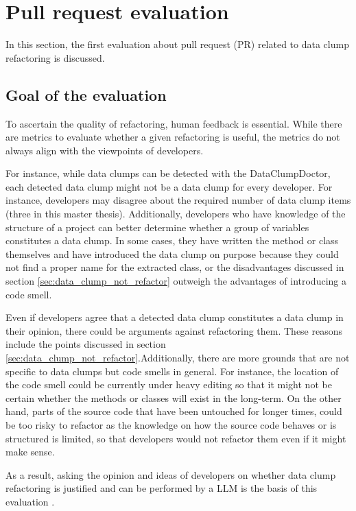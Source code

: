 \section{Pull request evaluation}
In this section, the first evaluation about pull request (PR) related to data clump refactoring is discussed. 

\subsection{Goal of the evaluation}

To ascertain the quality of refactoring, human feedback is essential. While there are metrics to evaluate whether a given refactoring is useful, the metrics do not always align with the viewpoints of developers. 

 For instance, while data clumps can be detected with the DataClumpDoctor, each detected data clump might not be a data clump for every developer. For instance, developers may disagree about the required number of data clump items (three in this master thesis). Additionally, developers who have knowledge of the structure of a project can better determine whether a group of variables  constitutes a data clump. In some cases, they have written the method or class themselves and have introduced the data clump on purpose because they could not find a proper name for the extracted class, or the disadvantages discussed in section \ref{sec:data_clump_not_refactor} outweigh the advantages of introducing a code smell. 

Even if developers agree that a detected data clump constitutes a data clump  in their opinion, there could be arguments against refactoring them. These reasons include the points  discussed in section \ref{sec:data_clump_not_refactor}.Additionally, there are more grounds that are not specific to data clumps but code smells in general. For instance, the location of the code smell could be currently under heavy editing so that it might not be certain whether the methods or classes will exist in the long-term. On the other hand, parts of the source code that have been untouched for longer times, could be too risky to refactor as the knowledge on how the source code behaves or is structured is limited, so that developers would not refactor them even if it might make sense. 

As a result, asking the opinion and ideas of developers on whether data clump refactoring is justified and can be performed by a \ac{LLM} is the basis of this evaluation .




